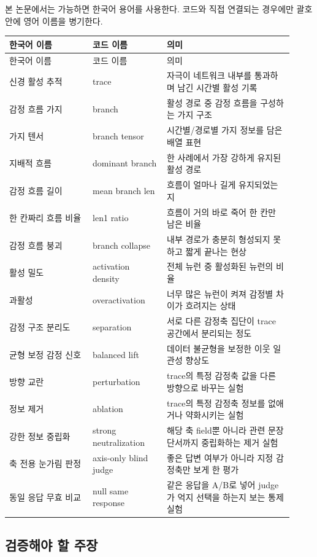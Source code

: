 \documentclass[11pt,a4paper]{article}
\begin{document}
본 논문에서는 가능하면 한국어 용어를 사용한다. 코드와 직접 연결되는 경우에만 괄호 안에 영어 이름을 병기한다.

\begin{longtable}{p{0.27\linewidth}p{0.24\linewidth}p{0.41\linewidth}}
\toprule
한국어 이름 & 코드 이름 & 의미 \\
\midrule
\endfirsthead
\toprule
한국어 이름 & 코드 이름 & 의미 \\
\midrule
\endhead
신경 활성 추적 & trace & 자극이 네트워크 내부를 통과하며 남긴 시간별 활성 기록 \\
감정 흐름 가지 & branch & 활성 경로 중 감정 흐름을 구성하는 가지 구조 \\
가지 텐서 & branch tensor & 시간별/경로별 가지 정보를 담은 배열 표현 \\
지배적 흐름 & dominant branch & 한 사례에서 가장 강하게 유지된 활성 경로 \\
감정 흐름 길이 & mean branch len & 흐름이 얼마나 길게 유지되었는지 \\
한 칸짜리 흐름 비율 & len1 ratio & 흐름이 거의 바로 죽어 한 칸만 남은 비율 \\
감정 흐름 붕괴 & branch collapse & 내부 경로가 충분히 형성되지 못하고 짧게 끝나는 현상 \\
활성 밀도 & activation density & 전체 뉴런 중 활성화된 뉴런의 비율 \\
과활성 & overactivation & 너무 많은 뉴런이 켜져 감정별 차이가 흐려지는 상태 \\
감정 구조 분리도 & separation & 서로 다른 감정축 집단이 trace 공간에서 분리되는 정도 \\
균형 보정 감정 신호 & balanced lift & 데이터 불균형을 보정한 이웃 일관성 향상도 \\
방향 교란 & perturbation & trace의 특정 감정축 값을 다른 방향으로 바꾸는 실험 \\
정보 제거 & ablation & trace의 특정 감정축 정보를 없애거나 약화시키는 실험 \\
강한 정보 중립화 & strong neutralization & 해당 축 field뿐 아니라 관련 문장 단서까지 중립화하는 제거 실험 \\
축 전용 눈가림 판정 & axis-only blind judge & 좋은 답변 여부가 아니라 지정 감정축만 보게 한 평가 \\
동일 응답 무효 비교 & null same response & 같은 응답을 A/B로 넣어 judge가 억지 선택을 하는지 보는 통제 실험 \\
\bottomrule
\end{longtable}

\subsection{검증해야 할 주장}
\end{document}
